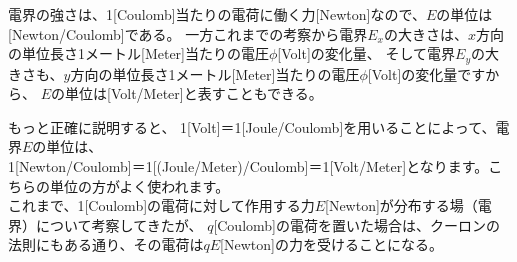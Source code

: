 \documentclass[uplatex,a4paper,11pt,oneside,openany]{jsbook}
\begin{document}
電界の強さは、1[Coulomb]当たりの電荷に働く力[Newton]なので、$E$の単位は[Newton/Coulomb]である。
一方これまでの考察から電界$E_x$の大きさは、$x$方向の単位長さ1メートル[Meter]当たりの電圧$\phi$[Volt]の変化量、
そして電界$E_y$の大きさも、$y$方向の単位長さ1メートル[Meter]当たりの電圧$\phi$[Volt]の変化量ですから、
$E$の単位は[Volt/Meter]と表すこともできる。

もっと正確に説明すると、
1[Volt]＝1[Joule/Coulomb]を用いることによって、電界$E$の単位は、\\
1[Newton/Coulomb]＝1[(Joule/Meter)/Coulomb]＝1[Volt/Meter]となります。こちらの単位の方がよく使われます。\\

これまで、1[Coulomb]の電荷に対して作用する力$E$[Newton]が分布する場（電界）について考察してきたが、
$q$[Coulomb]の電荷を置いた場合は、クーロンの法則にもある通り、その電荷は$qE$[Newton]の力を受けることになる。

\newpage
\end{document}
